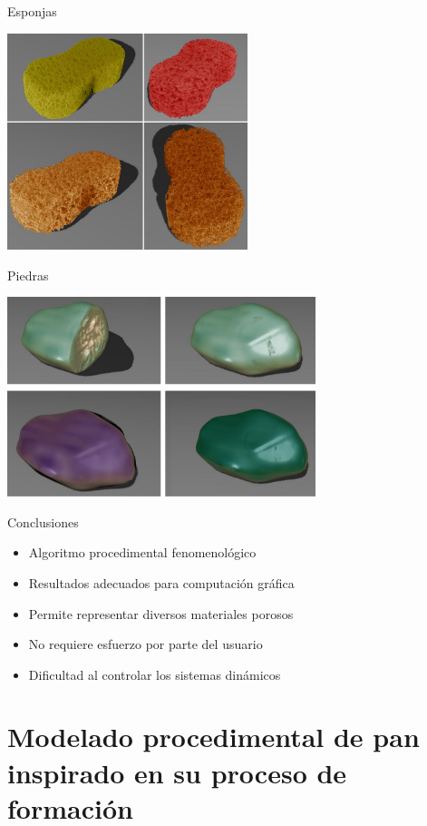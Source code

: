 \documentclass[spanish]{beamer}
\begin{document}
\begin{frame}{Esponjas}

\centerline{\includegraphics[width=7cm]{../figures/Fig13CAVW}}
\end{frame}

\begin{frame}{Piedras}

\centerline{\includegraphics[width=9cm]{../figures/Fig14CAVW}}
\end{frame}

\begin{frame}{Conclusiones}
\begin{block}{}
\begin{itemize}
\item Algoritmo procedimental fenomenológico
\item Resultados adecuados para computación gráfica
\item Permite representar diversos materiales porosos
\item No requiere esfuerzo por parte del usuario

\item Dificultad al controlar los sistemas dinámicos
\end{itemize}
\end{block}
\end{frame}


\section[Modelado de Pan]{Modelado procedimental de pan inspirado en su proceso de formación}
\end{document}
